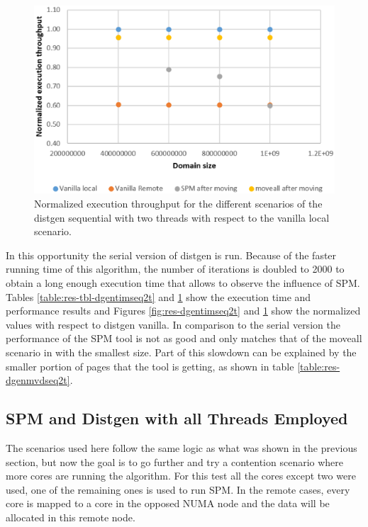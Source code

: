 \begin{figure}
	\centering
		\includegraphics[width=.8\textwidth]{figures/thrput-dgentt-ser.eps}
		\caption{Normalized execution throughput for the different scenarios of the distgen sequential with two threads with respect to the vanilla local scenario.}
		\label{fig:res-dgentrgseq2t}
\end{figure}


In this opportunity the serial version of distgen is run. Because of the faster running time of this algorithm, the number of iterations is doubled to 2000 to obtain a long enough execution time that allows to observe the influence of SPM. Tables \ref{table:res-tbl-dgentimseq2t} and \ref{fig:res-dgentrgseq2t} show the execution time and performance results and Figures \ref{fig:res-dgentimseq2t} and \ref{fig:res-dgentrgseq2t} show the normalized values with respect to distgen vanilla. In comparison to the serial version the performance of the SPM tool is not as good and only matches that of the moveall scenario in with the smallest size. Part of this slowdown can be explained by the smaller portion of pages that the tool is getting, as shown in table \ref{table:res-dgenmvdseq2t}.

\subsection{SPM and Distgen with all Threads Employed}\label{subsection:res-spmydistgen-at}

The scenarios used here follow the same logic as what was shown in the previous section, but now the goal is to go further and try a contention scenario where more cores are running the algorithm. For this test all the cores except two were used, one of the remaining ones is used to run SPM. In the remote cases, every core is mapped to a core in the opposed NUMA node and the data will be allocated in this remote node.

